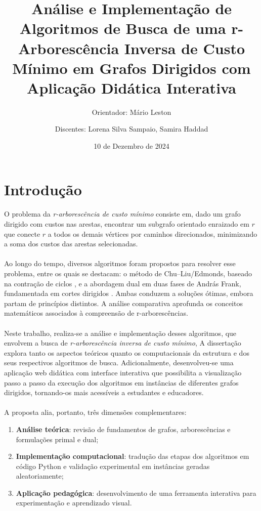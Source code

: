 \documentclass[12pt,a4paper]{article}
\title{Análise e Implementação de Algoritmos de Busca de uma r-Arborescência Inversa de Custo Mínimo em Grafos Dirigidos com Aplicação Didática Interativa}
\author{Orientador: Mário Leston 
\and Discentes: Lorena Silva Sampaio, Samira Haddad}
\date{10 de Dezembro de 2024}
\begin{document}
\maketitle

\section{Introdução}

\paragraph{}
O problema da \textit{r-arborescência de custo mínimo} consiste em, dado um grafo dirigido com custos nas arestas, encontrar um subgrafo orientado enraizado em \(r\) que conecte \(r\) a todos os demais vértices por caminhos direcionados, minimizando a soma dos custos das arestas selecionadas.  

\paragraph{}
Ao longo do tempo, diversos algoritmos foram propostos para resolver esse problema, 
entre os quais se destacam: o método de Chu--Liu/Edmonds, 
baseado na contração de ciclos \cite{chu1965,edmonds1967optimum}, 
e a abordagem dual em duas fases de András Frank, 
fundamentada em cortes dirigidos \cite{frank2014}. 
Ambas conduzem a soluções ótimas, embora partam de princípios distintos. 
A análise comparativa aprofunda os conceitos matemáticos associados à 
compreensão de r-arborescências.  

\paragraph{}
Neste trabalho, realiza-se a análise e implementação desses algoritmos, 
que envolvem a busca de \textit{r-arborescência inversa de custo mínimo}, 
A dissertação explora tanto os aspectos teóricos quanto os computacionais 
da estrutura e dos seus respectivos algoritmos de busca.
Adicionalmente, desenvolveu-se uma aplicação web didática com interface interativa que possibilita a visualização passo a passo da execução dos algoritmos em instâncias de diferentes grafos dirigidos, tornando-os mais acessíveis a estudantes e educadores.  

\paragraph{}
A proposta alia, portanto, três dimensões complementares:  
\begin{enumerate}
    \item \textbf{Análise teórica}: revisão de fundamentos de grafos, arborescências e formulações primal e dual;
    \item \textbf{Implementação computacional}: tradução das etapas dos algoritmos em código Python e validação experimental em instâncias geradas aleatoriamente;
    \item \textbf{Aplicação pedagógica}: desenvolvimento de uma ferramenta interativa para experimentação e aprendizado visual.
\end{enumerate}
\end{document}
